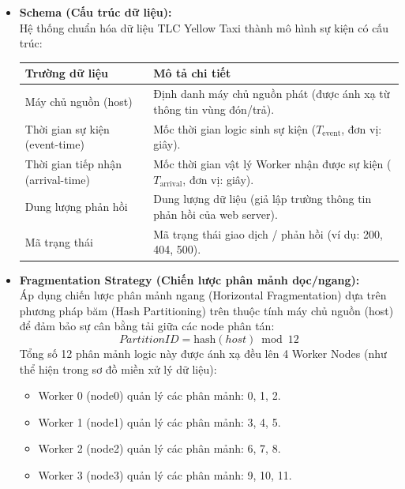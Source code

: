 \documentclass[12pt,a4paper]{article}
\begin{document}
\begin{itemize}[leftmargin=*]
    \item \textbf{Schema (Cấu trúc dữ liệu):} \\
    Hệ thống chuẩn hóa dữ liệu TLC Yellow Taxi thành mô hình sự kiện có cấu trúc:
    \begin{table}[H]
        \centering
        \small
        \begin{tabular}{lp{10cm}}
            \toprule
            \textbf{Trường dữ liệu} & \textbf{Mô tả chi tiết} \\
            \midrule
            Máy chủ nguồn (host) & Định danh máy chủ nguồn phát (được ánh xạ từ thông tin vùng đón/trả). \\
            Thời gian sự kiện (event-time) & Mốc thời gian logic sinh sự kiện ($T_{\text{event}}$, đơn vị: giây). \\
            Thời gian tiếp nhận (arrival-time) & Mốc thời gian vật lý Worker nhận được sự kiện ($T_{\text{arrival}}$, đơn vị: giây). \\
            Dung lượng phản hồi & Dung lượng dữ liệu (giả lập trường thông tin phản hồi của web server). \\
            Mã trạng thái & Mã trạng thái giao dịch / phản hồi (ví dụ: 200, 404, 500). \\
            \bottomrule
        \end{tabular}
    \end{table}

    \item \textbf{Fragmentation Strategy (Chiến lược phân mảnh dọc/ngang):} \\
    Áp dụng chiến lược phân mảnh ngang (Horizontal Fragmentation) dựa trên phương pháp băm (Hash Partitioning) trên thuộc tính máy chủ nguồn (host) để đảm bảo sự cân bằng tải giữa các node phân tán:
    {\large
    \begin{equation}
        \boxed{\displaystyle PartitionID = \text{hash}(host) \bmod 12}
    \end{equation}
    }
    Tổng số 12 phân mảnh logic này được ánh xạ đều lên 4 Worker Nodes (như thể hiện trong sơ đồ miền xử lý dữ liệu):
    \begin{itemize}[label={-}]
        \item Worker 0 (node0) quản lý các phân mảnh: 0, 1, 2.
        \item Worker 1 (node1) quản lý các phân mảnh: 3, 4, 5.
        \item Worker 2 (node2) quản lý các phân mảnh: 6, 7, 8.
        \item Worker 3 (node3) quản lý các phân mảnh: 9, 10, 11.
    \end{itemize}
\end{itemize}
\end{document}
